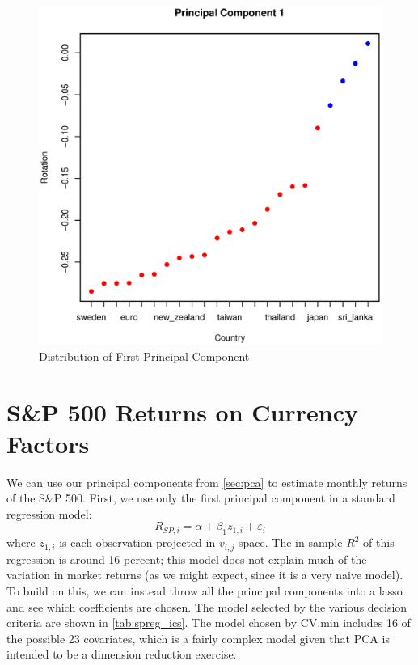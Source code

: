 \documentclass[11pt, fleqn]{article}
\begin{document}
\begin{figure}[!htb]
  \centering
  \includegraphics[scale=.5]{pc1_pegs.eps}
  \caption{Distribution of First Principal Component}
  \label{fig:pc1_pegs}
\end{figure} 

\section{S\&P 500 Returns on Currency Factors} \label{sec:sp500}

We can use our principal components from \cref{sec:pca} to estimate monthly returns of the S\&P 500. First, we use only the first principal component in a standard regression model:
\begin{equation}
R_{SP,i} = \alpha + \beta_1 z_{1,i} + \varepsilon_{i}
\end{equation}
where $z_{1,i}$ is each observation projected in $v_{i,j}$ space. The in-sample $R^2$ of this regression is around 16 percent; this model does not explain much of the variation in market returns (as we might expect, since it is a very naive model). To build on this, we can instead throw all the principal components into a lasso and see which coefficients are chosen. The model selected by the various decision criteria are shown in \cref{tab:spreg_ics}. The model chosen by CV.min includes 16 of the possible 23 covariates, which is a fairly complex model given that PCA is intended to be a dimension reduction exercise. 
\end{document}
